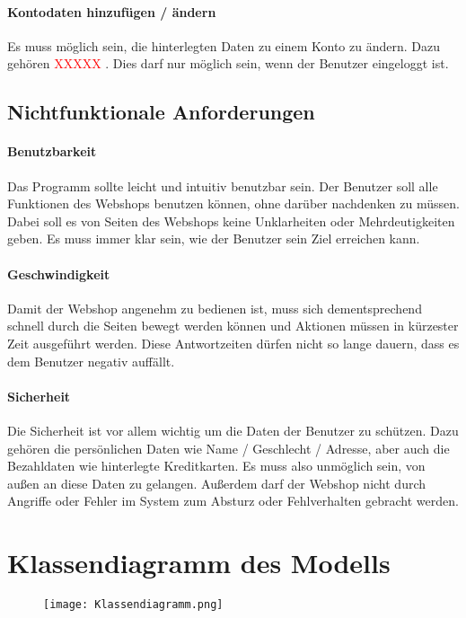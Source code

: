 \documentclass[a4paper]{article}
\begin{document}
\paragraph{Kontodaten hinzufügen / ändern}
Es muss möglich sein, die hinterlegten Daten zu einem Konto zu ändern. Dazu gehören \textcolor{red}{XXXXX} . Dies darf nur möglich sein, wenn der Benutzer eingeloggt ist.

\subsection{Nichtfunktionale Anforderungen}
\paragraph{Benutzbarkeit}
Das Programm sollte leicht und intuitiv benutzbar sein. Der Benutzer soll alle Funktionen des Webshops benutzen können, ohne darüber nachdenken zu müssen. Dabei soll es von Seiten des Webshops keine Unklarheiten oder Mehrdeutigkeiten geben. Es muss immer klar sein, wie der Benutzer sein Ziel erreichen kann.

\paragraph{Geschwindigkeit}
Damit der Webshop angenehm zu bedienen ist, muss sich dementsprechend schnell durch die Seiten bewegt werden können und Aktionen müssen in kürzester Zeit ausgeführt werden. Diese Antwortzeiten dürfen nicht so lange dauern, dass es dem Benutzer negativ auffällt.

\paragraph{Sicherheit}
Die Sicherheit ist vor allem wichtig um die Daten der Benutzer zu schützen. Dazu gehören die persönlichen Daten wie Name / Geschlecht / Adresse, aber auch die Bezahldaten wie hinterlegte Kreditkarten. Es muss also unmöglich sein, von außen an diese Daten zu gelangen. Außerdem darf der Webshop nicht durch Angriffe oder Fehler im System zum Absturz oder Fehlverhalten gebracht werden.

\section{Klassendiagramm des Modells}
\begin{figure}[H]
	\centering
	\texttt{[image: Klassendiagramm.png]}
\end{figure}
\end{document}
